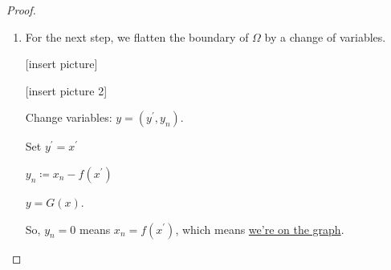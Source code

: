 \documentclass{article}
\theoremstyle{definition}
\newtheorem{theorem}{Theorem}
\begin{document}
\begin{proof}
\begin{enumerate}[label=\arabic*)]
        \begin{theorem}
            [Young's Inequality]

            For any \(a, b > 0\) and \(p, q\) such that \(\frac{1}{p} + \frac{1}{q} = 1\), we have:

            \[
                ab \leq \frac{a^p}{p} + \frac{b^q}{q}
            \]
        \end{theorem}

        We are estimating abolute value, so we can take absolute value. Using Young's inequality on \(a = \vert u_{x_n} \vert\) and \(b = \vert u \vert ^{p-1}\),

        \[
            \int_{\Gamma}^{} \vert u \vert ^ p \,\mathrm{d}x^{\prime} 
        \]

        \[
            \leq \int_{B }^{\infty} \left[ \vert \zeta_{x_n} \vert \vert u \vert ^ p + p \vert \zeta  \vert \left[ \frac{(\vert u \vert ^{p-1})^{p / (p-1)}}{p / (p-1)} + \frac{\vert u_{x_n} \vert ^{p}}{p} \right]  \right]  \,\mathrm{d}x 
        \]

        \[
            \leq C \int_{B \cap \Omega}^{} \left[ \vert u \vert ^ p + \vert \nabla u \vert ^ p \right] \,\mathrm{d}x \leq C \int_{\Omega}^{} \left[ \vert u \vert ^ p + \vert \nabla u \vert ^ p \right]  \,\mathrm{d}x 
        \]

        Now, \(\partial \Omega \in C^1\) means, centered at any point \(x_0 \in \partial \Omega\) \(\partial \Omega\) can be written as a graph \(x_n = f(x^{\prime})\) where \(\vert f \vert_{C_1}\) is bounded.\footnote{\(\vert f \vert_{C_1}= \sup \vert f \vert + \sup \vert \nabla f \vert \)}

        Therefore, Ball inside of which \(\partial \Omega\) is a graph has radius \(R\) depending on \(C^1\) norm.

        \item For the next step, we flatten the boundary of \(\Omega\) by a change of variables.
        
        [insert picture]

        [insert picture 2]

        Change variables: \(y = (y^{\prime} , y_n)\).

        Set \(y^{\prime}  = x^{\prime} \) 

        \(y_n \coloneqq x_n - f(x^{\prime})\) 

        \(y = G(x)\).

        So, \(y_n = 0\) means \(x_n = f(x^{\prime})\), which means \underline{we're on the graph}.


\end{enumerate}
\end{proof}
\end{document}
